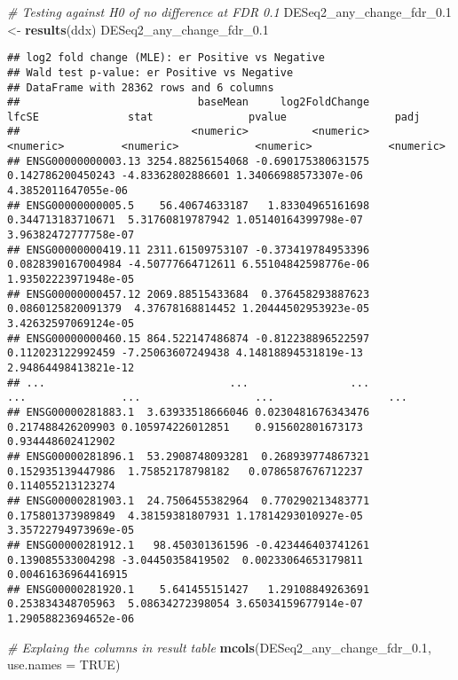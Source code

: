 \documentclass[]{book}
\newenvironment{Shaded}{\begin{snugshade}}{\end{snugshade}}
\newcommand{\KeywordTok}[1]{\textcolor[rgb]{0.13,0.29,0.53}{\textbf{#1}}}
\newcommand{\DataTypeTok}[1]{\textcolor[rgb]{0.13,0.29,0.53}{#1}}
\newcommand{\FloatTok}[1]{\textcolor[rgb]{0.00,0.00,0.81}{#1}}
\newcommand{\StringTok}[1]{\textcolor[rgb]{0.31,0.60,0.02}{#1}}
\newcommand{\CommentTok}[1]{\textcolor[rgb]{0.56,0.35,0.01}{\textit{#1}}}
\newcommand{\OtherTok}[1]{\textcolor[rgb]{0.56,0.35,0.01}{#1}}
\newcommand{\NormalTok}[1]{#1}
\begin{document}
\begin{Shaded}
\begin{Highlighting}[]
\CommentTok{# Testing against H0 of no difference at FDR 0.1}
\NormalTok{DESeq2_any_change_fdr_}\FloatTok{0.1}\NormalTok{ <-}\StringTok{ }\KeywordTok{results}\NormalTok{(ddx)}
\NormalTok{DESeq2_any_change_fdr_}\FloatTok{0.1}
\end{Highlighting}
\end{Shaded}

\begin{verbatim}
## log2 fold change (MLE): er Positive vs Negative 
## Wald test p-value: er Positive vs Negative 
## DataFrame with 28362 rows and 6 columns
##                            baseMean     log2FoldChange              lfcSE              stat               pvalue                 padj
##                           <numeric>          <numeric>          <numeric>         <numeric>            <numeric>            <numeric>
## ENSG00000000003.13 3254.88256154068 -0.690175380631575  0.142786200450243 -4.83362802886601 1.34066988573307e-06  4.3852011647055e-06
## ENSG00000000005.5    56.40674633187   1.83304965161698  0.344713183710671  5.31760819787942 1.05140164399798e-07 3.96382472777758e-07
## ENSG00000000419.11 2311.61509753107 -0.373419784953396 0.0828390167004984 -4.50777664712611 6.55104842598776e-06 1.93502223971948e-05
## ENSG00000000457.12 2069.88515433684  0.376458293887623 0.0860125820091379  4.37678168814452 1.20444502953923e-05 3.42632597069124e-05
## ENSG00000000460.15 864.522147486874 -0.812238896522597  0.112023122992459 -7.25063607249438 4.14818894531819e-13 2.94864498413821e-12
## ...                             ...                ...                ...               ...                  ...                  ...
## ENSG00000281883.1  3.63933518666046 0.0230481676343476  0.217488426209903 0.105974226012851    0.915602801673173    0.934448602412902
## ENSG00000281896.1  53.2908748093281  0.268939774867321  0.152935139447986  1.75852178798182   0.0786587676712237    0.114055213123274
## ENSG00000281903.1  24.7506455382964  0.770290213483771  0.175801373989849  4.38159381807931 1.17814293010927e-05 3.35722794973969e-05
## ENSG00000281912.1   98.450301361596 -0.423446403741261  0.139085533004298 -3.04450358419502  0.00233064653179811  0.00461636964416915
## ENSG00000281920.1    5.641455151427   1.29108849263691  0.253834348705963  5.08634272398054 3.65034159677914e-07 1.29058823694652e-06
\end{verbatim}

\begin{Shaded}
\begin{Highlighting}[]
\CommentTok{# Explaing the columns in result table}
\KeywordTok{mcols}\NormalTok{(DESeq2_any_change_fdr_}\FloatTok{0.1}\NormalTok{, }\DataTypeTok{use.names =} \OtherTok{TRUE}\NormalTok{)}
\end{Highlighting}
\end{Shaded}
\end{document}
